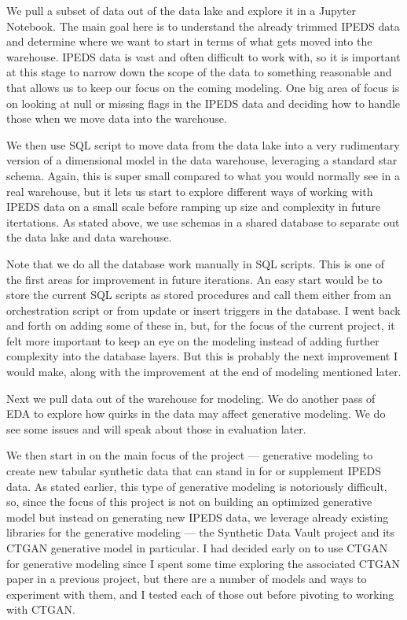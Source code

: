 \documentclass[sigconf, authorversion, nonacm]{acmart}
\begin{document}
        We pull a subset of data out of the data lake and explore it in a Jupyter Notebook. The main goal here is to understand the already trimmed IPEDS data and determine where we want to start in terms of what gets moved into the warehouse. IPEDS data is vast and often difficult to work with, so it is important at this stage to narrow down the scope of the data to something reasonable and that allows us to keep our focus on the coming modeling. One big area of focus is on looking at null or missing flags in the IPEDS data and deciding how to handle those when we move data into the warehouse.

        We then use SQL script to move data from the data lake into a very rudimentary version of a dimensional model in the data warehouse, leveraging a standard star schema. Again, this is super small compared to what you would normally see in a real warehouse, but it lets us start to explore different ways of working with IPEDS data on a small scale before ramping up size and complexity in future itertations. As stated above, we use schemas in a shared database to separate out the data lake and data warehouse.

        Note that we do all the database work manually in SQL scripts. This is one of the first areas for improvement in future iterations. An easy start would be to store the current SQL scripts as stored procedures and call them either from an orchestration script or from update or insert triggers in the database. I went back and forth on adding some of these in, but, for the focus of the current project, it felt more important to keep an eye on the modeling instead of adding further complexity into the database layers. But this is probably the next improvement I would make, along with the improvement at the end of modeling mentioned later.

        Next we pull data out of the warehouse for modeling. We do another pass of EDA to explore how quirks in the data may affect generative modeling. We do see some issues and will speak about those in evaluation later.

        We then start in on the main focus of the project --- generative modeling to create new tabular synthetic data that can stand in for or supplement IPEDS data. As stated earlier, this type of generative modeling is notoriously difficult, so, since the focus of this project is not on building an optimized generative model but instead on generating new IPEDS data, we leverage already existing libraries for the generative modeling --- the Synthetic Data Vault project and its CTGAN generative model in particular. I had decided early on to use CTGAN for generative modeling since I spent some time exploring the associated CTGAN paper in a previous project, but there are a number of models and ways to experiment with them, and I tested each of those out before pivoting to working with CTGAN.
\end{document}
